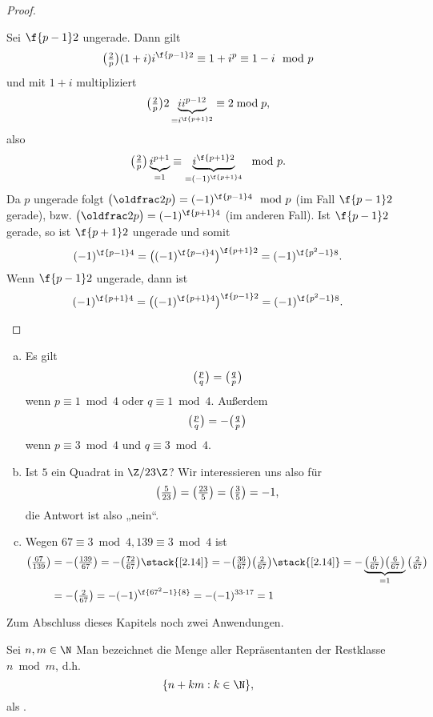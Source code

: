 \begin{st}
\begin{proof}
\begin{enumerate}[a)]
				Sei $\f {p-1}2$ ungerade.
				Dann gilt
				\[
					\legsym 2p (1 +i)i^{\f {p-1}2}
					\equiv 1 + i^p
					\equiv 1 -i \mod p
				\]
				und mit $1 + i$ multipliziert
				\[
					\legsym 2p 2 \underbrace{i i^{{p-1}2}}_{=i^{\f{p+1}2}}
					\equiv 2 \bmod p,
				\]
				also
				\[
					\legsym 2p \underbrace{i^{p+1}}_{= 1} \equiv \underbrace{i^{\f{p+1}2}}_{=(-1)^{\f {p+1}4}} \mod p.
				\]
				Da $p$ ungerade folgt
				$\legsym 2p = (-1)^{\f {p-1}4} \mod p$ (im Fall $\f {p-1}2$ gerade), bzw. $\legsym 2p = (-1)^{\f{p+1}4}$ (im anderen Fall).
				Ist $\f {p-1}2$ gerade, so ist $\f {p+1}2$ ungerade und somit
				\[
					(-1)^{\f{p-1}4}
					= \big((-1)^{\f{p-i}4} \big)^{\f{p+1}2}
					= (-1)^{\f{p^2-1}8}.
				\]
				Wenn $\f {p-1}2$ ungerade, dann ist
				\[
					(-1)^{\f {p+1}4}
					= \big( (-1)^{\f {p+1}4} \big)^{\f{p-1}2}
					= (-1)^{\f {p^2 - 1}8}.
				\]
		\end{enumerate}
	\end{proof}
\end{st}


\begin{nt} \label{2.16}
	\begin{enumerate}[a)]
		\item
			Es gilt
			\[
				\legsym pq = \legsym qp
			\]
			wenn $p \equiv 1 \bmod 4$ oder $q \equiv 1 \bmod 4$.
			Außerdem
			\[
				\legsym pq = - \legsym qp
			\]
			wenn $p \equiv 3 \bmod 4$ und $q \equiv 3 \bmod 4$.
		\item
			Ist $5$ ein Quadrat in $\Z / 23\Z$?
			Wir interessieren uns also für
			\[
				\legsym 5{23}
				= \legsym {23}5
				= \legsym 35
				= -1,
			\]
			die Antwort ist also „nein“.
		\item
			Wegen $67 \equiv 3 \bmod 4, 139 \equiv 3 \bmod 4$ ist
			\begin{align*}
				\legsym{67}{139}
				&= - \legsym{139}{67}
				= - \legsym{72}{67}
				\stack{\ref{2.14}}= - \legsym{36}{67} \legsym{2}{67}
				\stack{\ref{2.14}}= - \underbrace{\legsym{6}{67} \legsym{6}{67}}_{=1} \legsym{2}{67} \\
				&= - \legsym{2}{67}
				= - (-1)^{\f{67^2-1}{8}}
				= - (-1)^{33\cdot 17}
				= 1
			\end{align*}
	\end{enumerate}
\end{nt}

Zum Abschluss dieses Kapitels noch zwei Anwendungen.

\begin{df*}
	Sei $n, m \in \N$
	Man bezeichnet die Menge aller Repräsentanten der Restklasse $n \bmod m$, d.h.
	\[
		\{ n + km : k \in \N \},
	\]
	als .
\end{df*}

